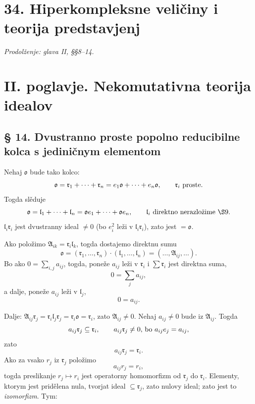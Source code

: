 \documentclass[11pt]{article}
\providecommand{\mA}{\mathfrak{A}}
\providecommand{\ml}{\mathfrak{l}}
\providecommand{\mo}{\mathfrak{o}}
\providecommand{\mr}{\mathfrak{r}}
\begin{document}
\section*{34. Hiperkompleksne veličiny i teorija predstavjenj}
\emph{Prodolženje: glava II, §§8--14.}

\section*{II. poglavje. Nekomutativna teorija idealov}

\subsection*{§ 14. Dvustranno proste popolno reducibilne kolca s jediničnym elementom}

Nehaj $\mo$ bude tako kolco:
\[
        \mo=\mr_1+\cdots+\mr_n=e_1\mo+\cdots+e_n\mo,
        \qquad \mr_i\hbox{ proste}.
\]
Togda slěduje
\[
        \mo=\ml_1+\cdots+\ml_n=\mo e_1+\cdots+\mo e_n,
        \qquad \ml_i\hbox{ direktno nerazložime }\hbox{\(\S 9\)}.
\]
$\ml_i\mr_i$ jest dvustranny ideal $\ne0$ (bo $e_i^2$ leži v $\ml_i\mr_i$), zato jest $=\mo$.

Ako položimo $\mA_{ik}=\mr_i\ml_k$, togda dostajemo direktnu sumu
\[
        \mo=(\mr_1,\ldots,\mr_n)\cdot(\ml_1,\ldots,\ml_n)
        = (\ldots,\mA_{ij},\ldots).
\]
Bo ako $0=\sum_{i,j}a_{ij}$, togda, poneže $a_{ij}$ leži v $\mr_i$ i $\sum\mr_i$ jest direktna suma,
\[
        0=\sum_j a_{ij},
\]
a dalje, poneže $a_{ij}$ leži v $\ml_j$,
\[
        0=a_{ij}.
\]

Dalje: $\mA_{ij}\mr_j=\mr_i\ml_j\mr_j=\mr_i\mo=\mr_i$, zato $\mA_{ij}\ne0$. Nehaj $a_{ij}\ne0$ bude iz $\mA_{ij}$. Togda
\[
        a_{ij}\mr_j\subseteq\mr_i,
        \qquad
        a_{ij}\mr_j\ne0 \hbox{, bo } a_{ij}e_j=a_{ij},
\]
zato
\[
        a_{ij}\mr_j=\mr_i.
\]
Ako za vsako $r_j$ iz $\mr_j$ položimo
\[
        a_{ij}r_j=r_i,
\]
togda preslikanje $r_j\mapsto r_i$ jest operatorny homomorfizm od $\mr_j$ do $\mr_i$. Elementy, ktorym jest pridělena nula, tvorjat ideal $\subseteq\mr_j$, zato nulovy ideal; zato jest to \emph{izomorfizm}. Tym:
\end{document}
